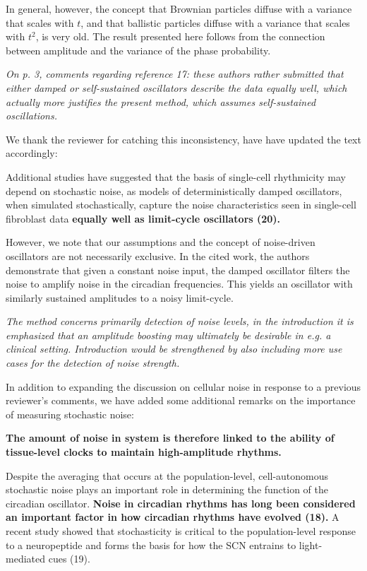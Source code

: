 \documentclass[11pt, letterpaper]{article}
\newenvironment{reviewer}{\itshape\color{gray}}{}
\newenvironment{manuscript}[1]{\begin{center}\begin{tcolorbox}[colback=green!5!white,colframe=green!75!black,width=\textwidth,title={#1},breakable,fonttitle=\bfseries]}{\end{tcolorbox}\end{center}}
\begin{document}
In general, however, the concept that Brownian particles diffuse with a variance that scales with $t$, and that ballistic particles diffuse with a variance that scales with $t^2$, is very old. The result presented here follows from the connection between amplitude and the variance of the phase probability.

\begin{reviewer}
On p. 3, comments regarding reference 17: these authors rather submitted that either damped or self-sustained oscillators describe the data equally well, which actually more justifies the present method, which assumes self-sustained oscillations.
\end{reviewer}

We thank the reviewer for catching this inconsistency, have have updated the text accordingly:

\begin{manuscript}{Page 3}
  Additional studies have suggested that the basis of single-cell rhythmicity may depend on stochastic noise, as models of deterministically damped oscillators, when simulated stochastically, capture the noise characteristics seen in single-cell fibroblast data {\bfseries equally well as limit-cycle oscillators (20).}
\end{manuscript}

However, we note that our assumptions and the concept of noise-driven oscillators are not necessarily exclusive. In the cited work, the authors demonstrate that given a constant noise input, the damped oscillator filters the noise to amplify noise in the circadian frequencies. This yields an oscillator with similarly sustained amplitudes to a noisy limit-cycle.

\begin{reviewer}
The method concerns primarily detection of noise levels, in the introduction it is emphasized that an amplitude boosting may ultimately be desirable in e.g. a clinical setting. Introduction would be strengthened by also including more use cases for the detection of noise strength.
\end{reviewer}

In addition to expanding the discussion on cellular noise in response to a previous reviewer's comments, we have added some additional remarks on the importance of measuring stochastic noise:

\begin{manuscript}{Page 3}
  {\bfseries
  The amount of noise in system is therefore linked to the ability of tissue-level clocks to maintain high-amplitude rhythms. }

Despite the averaging that occurs at the population-level, cell-autonomous stochastic noise plays an important role in determining the function of the circadian oscillator. {\bfseries Noise in circadian rhythms has long been considered an important factor in how circadian rhythms have evolved (18).} A recent study showed that stochasticity is critical to the population-level response to a neuropeptide and forms the basis for how the SCN entrains to light-mediated cues (19).
\end{manuscript}
\end{document}
